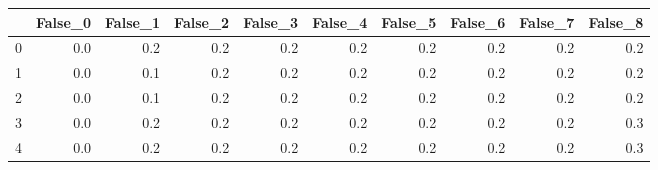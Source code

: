 \begin{tabular}{lrrrrrrrrr}
\toprule
{} &  False\_0 &  False\_1 &  False\_2 &  False\_3 &  False\_4 &  False\_5 &  False\_6 &  False\_7 &  False\_8 \\ \hline
\midrule
0 &      0.0 &      0.2 &      0.2 &      0.2 &      0.2 &      0.2 &      0.2 &      0.2 &      0.2 \\ \hline
1 &      0.0 &      0.1 &      0.2 &      0.2 &      0.2 &      0.2 &      0.2 &      0.2 &      0.2 \\ \hline
2 &      0.0 &      0.1 &      0.2 &      0.2 &      0.2 &      0.2 &      0.2 &      0.2 &      0.2 \\ \hline
3 &      0.0 &      0.2 &      0.2 &      0.2 &      0.2 &      0.2 &      0.2 &      0.2 &      0.3 \\ \hline
4 &      0.0 &      0.2 &      0.2 &      0.2 &      0.2 &      0.2 &      0.2 &      0.2 &      0.3 \\ \hline
\bottomrule
\end{tabular}
